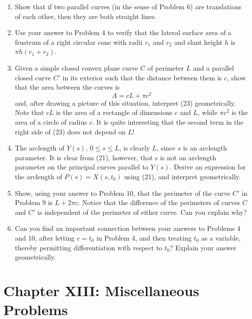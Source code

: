 \documentclass{book}
\begin{document}
\begin{enumerate}
  \item Show that if two parallel curves (in the sense of Problem 6) are translations of each other, then they are both straight lines.
  \item Use your answer to Problem 4 to verify that the lateral surface area of a frustrum of a right circular cone with radii $r_{1}$ and $r_{2}$ and slant height $h$ is $\pi h (r_{1} + r_{2})$.
  \item Given a simple closed convex plane curve $C$ of perimeter $L$ and a parallel closed curve $C'$ in its exterior such that the distance between them is $c$, show that the area between the curves is
    \begin{equation}
      A = cL + \pi c^{2}
    \end{equation}
    and, after drawing a picture of this situation, interpret (23) geometrically. Note that $cL$ is the area of a rectangle of dimensions $c$ and $L$, while $\pi c^{2}$ is the area of a circle of radius $c$. It is quite interesting that the second term in the right side of (23) does not depend on $L$!
  \item The arclength of $Y(s)$, $0 \leq s \leq L$, is clearly $L$, since $s$ is an arclength parameter. It is clear from (21), however, that s is not an arclength parameter on the principal curves parallel to $Y(s)$. Derive an expression for the arclength of $P(s) = X(s,t_{0})$ using (21), and interpret geometrically.
  \item Show, using your answer to Problem 10, that the perimeter of the curve $C'$ in Problem 9 is $L + 2 \pi c$. Notice that the difference of the perimeters of curves $C$ and $C'$ is independent of the perimeter of either curve. Can you explain why?
  \item Can you find an important connection between your answers to Problems 4 and 10, after letting $c = t_{0}$ in Problem 4, and then treating $t_{0}$ as a variable, thereby permitting differentiation with respect to $t_{0}$? Explain your answer geometrically.
\end{enumerate}



\chapter*{Chapter XIII: Miscellaneous Problems}

\setcounter{equation}{0}
\end{document}
